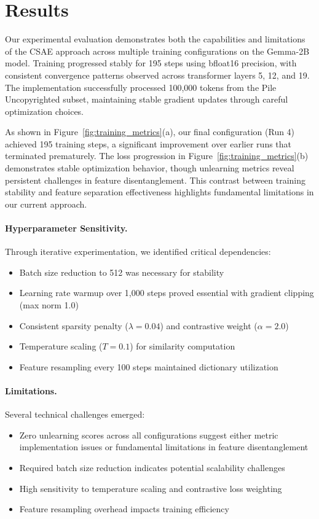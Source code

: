 \documentclass{article} %
\begin{document}
\section{Results}
\label{sec:results}

Our experimental evaluation demonstrates both the capabilities and limitations of the CSAE approach across multiple training configurations on the Gemma-2B model. Training progressed stably for 195 steps using bfloat16 precision, with consistent convergence patterns observed across transformer layers 5, 12, and 19. The implementation successfully processed 100,000 tokens from the Pile Uncopyrighted subset, maintaining stable gradient updates through careful optimization choices.

As shown in Figure~\ref{fig:training_metrics}(a), our final configuration (Run 4) achieved 195 training steps, a significant improvement over earlier runs that terminated prematurely. The loss progression in Figure~\ref{fig:training_metrics}(b) demonstrates stable optimization behavior, though unlearning metrics reveal persistent challenges in feature disentanglement. This contrast between training stability and feature separation effectiveness highlights fundamental limitations in our current approach.

\paragraph{Hyperparameter Sensitivity.} Through iterative experimentation, we identified critical dependencies:
\begin{itemize}
    \item Batch size reduction to 512 was necessary for stability
    \item Learning rate warmup over 1,000 steps proved essential with gradient clipping (max norm 1.0)
    \item Consistent sparsity penalty ($\lambda = 0.04$) and contrastive weight ($\alpha = 2.0$)
    \item Temperature scaling ($T = 0.1$) for similarity computation
    \item Feature resampling every 100 steps maintained dictionary utilization
\end{itemize}

\paragraph{Limitations.} Several technical challenges emerged:
\begin{itemize}
    \item Zero unlearning scores across all configurations suggest either metric implementation issues or fundamental limitations in feature disentanglement
    \item Required batch size reduction indicates potential scalability challenges
    \item High sensitivity to temperature scaling and contrastive loss weighting
    \item Feature resampling overhead impacts training efficiency
\end{itemize}
\end{document}
